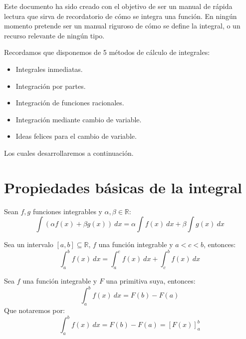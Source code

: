 Este documento ha sido creado con el objetivo de ser un manual de rápida lectura que sirva de recordatorio de cómo se integra una función. En ningún momento pretende ser un manual riguroso de cómo se define la integral, o un recurso relevante de ningún tipo.

\noindent
Recordamos que disponemos de 5 métodos de cálculo de integrales:
\begin{itemize}
    \item Integrales inmediatas.
    \item Integración por partes.
    \item Integración de funciones racionales.
    \item Integración mediante cambio de variable.
    \item Ideas felices para el cambio de variable.
\end{itemize}
Los cuales desarrollaremos a continuación.

\section{Propiedades básicas de la integral}
\begin{prop}
    Sean $f, g$ funciones integrables y $\alpha, \beta \in \mathbb{R}$:
    \begin{equation*}
        \int (\alpha f(x) + \beta g(x))~dx = \alpha \int f(x)~dx  + \beta \int g(x)~dx 
    \end{equation*}
\end{prop}

\begin{prop}
    Sea un intervalo $[a, b] \subseteq \mathbb{R}$, $f$ una función integrable y $a < c < b$, entonces:
    \begin{equation*}
        \int_{a}^{b} f(x)~dx = \int_{a}^{c} f(x)~dx + \int_{c}^{b} f(x)~dx 
    \end{equation*}
\end{prop}

\begin{prop}
    Sea $f$ una función integrable y $F$ una primitiva suya, entonces:
    \begin{equation*}
        \int_{a}^{b} f(x)~dx = F(b) - F(a)
    \end{equation*}
    Que notaremos por:
    \begin{equation*}
        \int_{a}^{b} f(x)~dx = F(b) - F(a) = {[F(x)]}^b_a
    \end{equation*}
\end{prop}

